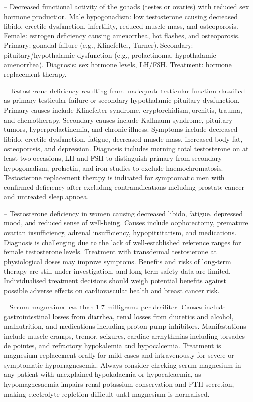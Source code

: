 -- Decreased functional activity of the gonads (testes or ovaries) with reduced sex hormone production. Male hypogonadism: low testosterone causing decreased libido, erectile dysfunction, infertility, reduced muscle mass, and osteoporosis. Female: estrogen deficiency causing amenorrhea, hot flashes, and osteoporosis. Primary: gonadal failure (e.g., Klinefelter, Turner). Secondary: pituitary/hypothalamic dysfunction (e.g., prolactinoma, hypothalamic amenorrhea). Diagnosis: sex hormone levels, LH/FSH. Treatment: hormone replacement therapy.

-- Testosterone deficiency resulting from inadequate testicular function classified as primary testicular failure or secondary hypothalamic-pituitary dysfunction. Primary causes include Klinefelter syndrome, cryptorchidism, orchitis, trauma, and chemotherapy. Secondary causes include Kallmann syndrome, pituitary tumors, hyperprolactinemia, and chronic illness. Symptoms include decreased libido, erectile dysfunction, fatigue, decreased muscle mass, increased body fat, osteoporosis, and depression. Diagnosis includes morning total testosterone on at least two occasions, LH and FSH to distinguish primary from secondary hypogonadism, prolactin, and iron studies to exclude haemochromatosis. Testosterone replacement therapy is indicated for symptomatic men with confirmed deficiency after excluding contraindications including prostate cancer and untreated sleep apnoea.

-- Testosterone deficiency in women causing decreased libido, fatigue, depressed mood, and reduced sense of well-being. Causes include oophorectomy, premature ovarian insufficiency, adrenal insufficiency, hypopituitarism, and medications. Diagnosis is challenging due to the lack of well-established reference ranges for female testosterone levels. Treatment with transdermal testosterone at physiological doses may improve symptoms. Benefits and risks of long-term therapy are still under investigation, and long-term safety data are limited. Individualised treatment decisions should weigh potential benefits against possible adverse effects on cardiovascular health and breast cancer risk.

-- Serum magnesium less than 1.7 milligrams per deciliter. Causes include gastrointestinal losses from diarrhea, renal losses from diuretics and alcohol, malnutrition, and medications including proton pump inhibitors. Manifestations include muscle cramps, tremor, seizures, cardiac arrhythmias including torsades de pointes, and refractory hypokalemia and hypocalcemia. Treatment is magnesium replacement orally for mild cases and intravenously for severe or symptomatic hypomagnesemia. Always consider checking serum magnesium in any patient with unexplained hypokalaemia or hypocalcaemia, as hypomagnesaemia impairs renal potassium conservation and PTH secretion, making electrolyte repletion difficult until magnesium is normalised.


